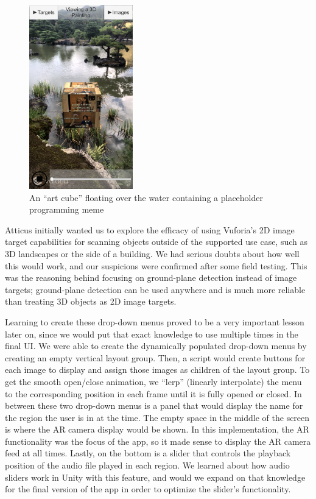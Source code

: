 \documentclass[a4paper, 10pt, american, titlepage]{article}
\begin{document}
\begin{figure}[h]
	\centering
	\includegraphics[width=0.4\textwidth]{floating-cube.png}
	\caption{An ``art cube'' floating over the water containing a placeholder
    programming meme}
	\label{fig:floatingCube}
\end{figure}

Atticus initially wanted us to explore the efficacy of using Vuforia's 2D image
target capabilities for scanning objects outside of the supported use case, such
as 3D landscapes or the side of a building. We had serious doubts about how well
this would work, and our suspicions were confirmed after some field testing.
This was the reasoning behind focusing on ground-plane detection instead of
image targets; ground-plane detection can be used anywhere and is much more
reliable than treating 3D objects as 2D image targets.

Learning to create these drop-down menus proved to be a very important lesson
later on, since we would put that exact knowledge to use multiple times in the
final UI. We were able to create the dynamically populated drop-down menus by
creating an empty vertical layout group. Then, a script would create buttons for
each image to display and assign those images as children of the layout group.
To get the smooth open/close animation, we ``lerp'' (linearly interpolate) the
menu to the corresponding position in each frame until it is fully opened or
closed. In between these two drop-down menus is a panel that would display the
name for the region the user is in at the time. The empty space in the middle of
the screen is where the AR camera display would be shown. In this
implementation, the AR functionality was the focus of the app, so it made sense
to display the AR camera feed at all times. Lastly, on the bottom is a slider
that controls the playback position of the audio file played in each region. We
learned about how audio sliders work in Unity with this feature, and would we
expand on that knowledge for the final version of the app in order to optimize
the slider's functionality.
\end{document}
